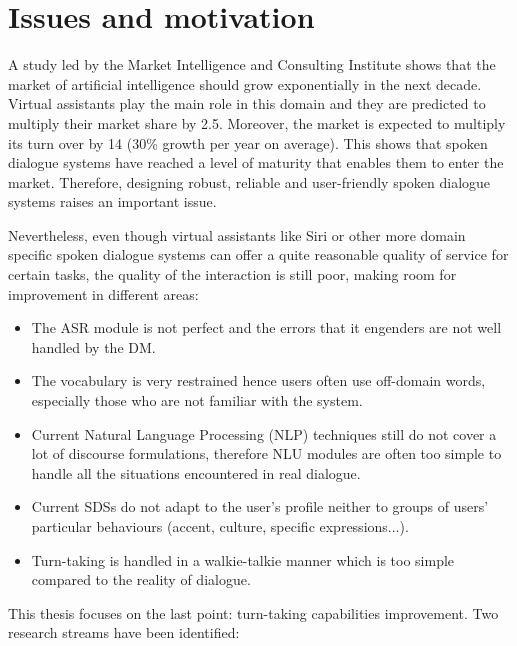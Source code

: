 \section{Issues and motivation}
    
    A study led by the Market Intelligence and Consulting Institute shows that the market of artificial intelligence should grow exponentially in the next decade. Virtual assistants play the main role in this domain and they are predicted to multiply their market share by 2.5. Moreover, the market is expected to multiply its turn over by 14 (30\% growth per year on average). This shows that spoken dialogue systems have reached a level of maturity that enables them to enter the market. Therefore, designing robust, reliable and user-friendly spoken dialogue systems raises an important issue.
    
    Nevertheless, even though virtual assistants like Siri or other more domain specific spoken dialogue systems can offer a quite reasonable quality of service for certain tasks, the quality of the interaction is still poor, making room for improvement in different areas:
    
    \begin{itemize}
    	\item The ASR module is not perfect and the errors that it engenders are not well handled by the DM.
        \item The vocabulary is very restrained hence users often use off-domain words, especially those who are not familiar with the system.
        \item Current Natural Language Processing (NLP) techniques still do not cover a lot of discourse formulations, therefore NLU modules are often too simple to handle all the situations encountered in real dialogue.
        \item Current SDSs do not adapt to the user's profile neither to groups of users' particular behaviours (accent, culture, specific expressions...).
        \item Turn-taking is handled in a walkie-talkie manner which is too simple compared to the reality of dialogue.
    \end{itemize}
    
    This thesis focuses on the last point: turn-taking capabilities improvement. Two research streams have been identified:
    
